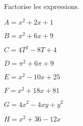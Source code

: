 
Factorise les expressions.

\begin{minipage}{4cm}
\begin{description}
\item $A=x^2+2x+1$
\item $B=x^2+6x+9$ 
\end{description}
\end{minipage}
\begin{minipage}{4cm}
\begin{description} 
\item $C=4T^2-8T+4$ 
\item $D=\pi^2+6\pi+9$ 
\end{description}
\end{minipage}
\begin{minipage}{4cm}
\begin{description}
\item $E=x^2-10x+25$ 
\item $F=x^2+18x+81$ 
\end{description}
\end{minipage}
\begin{minipage}{4cm}
\begin{description}
\item $G=4x^2-4xy+y^2$ 
\item $H=x^2+36-12x$ 
\end{description}
\end{minipage}
